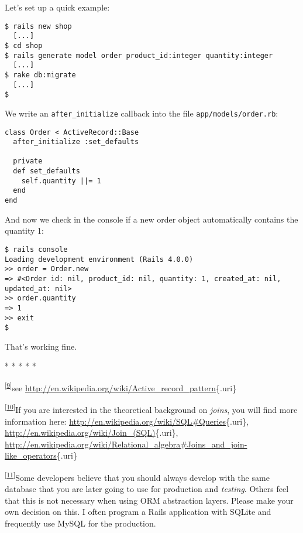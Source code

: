 \documentclass[a4paper]{book}
\newcounter{tab}[chapter]
\begin{document}
Let's set up a quick example:

\begin{shaded}\begin{verbatim}
$ rails new shop
  [...]
$ cd shop
$ rails generate model order product_id:integer quantity:integer
  [...]
$ rake db:migrate
  [...]
$
\end{verbatim}\end{shaded}

We write an \texttt{after\_initialize} callback into the file \texttt{app/models/order.rb}:

\begin{shaded}\begin{verbatim}
class Order < ActiveRecord::Base
  after_initialize :set_defaults

  private
  def set_defaults
    self.quantity ||= 1
  end
end
\end{verbatim}\end{shaded}

And now we check in the console if a new order object automatically contains the quantity 1:

\begin{shaded}\begin{verbatim}
$ rails console
Loading development environment (Rails 4.0.0)
>> order = Order.new
=> #<Order id: nil, product_id: nil, quantity: 1, created_at: nil, updated_at: nil>
>> order.quantity
=> 1
>> exit
$
\end{verbatim}\end{shaded}

That's working fine.

* * * * *

\textsuperscript{{[}\hyperref[idp2940224]{9}{]}}see \url{http://en.wikipedia.org/wiki/Active_record_pattern}\{.uri\}

\textsuperscript{{[}\hyperref[idp4450352]{10}{]}}If you are interested in the theoretical background on \emph{joins}, you will find more information here: \url{http://en.wikipedia.org/wiki/SQL\#Queries}\{.uri\}, \url{http://en.wikipedia.org/wiki/Join_(SQL)}\{.uri\}, \url{http://en.wikipedia.org/wiki/Relational_algebra\#Joins_and_join-like_operators}\{.uri\}

\textsuperscript{{[}\hyperref[idp5093968]{11}{]}}Some developers believe that you should always develop with the same database that you are later going to use for production and \emph{testing}. Others feel that this is not necessary when using ORM abstraction layers. Please make your own decision on this. I often program a Rails application with SQLite and frequently use MySQL for the production.
\end{document}
